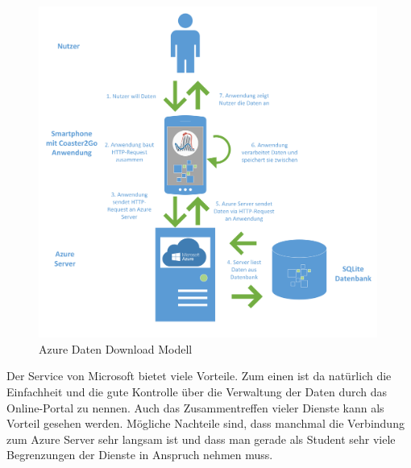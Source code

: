 \begin{figure}[htp]
	\centering
  	\includegraphics[width=0.99\textwidth]{img/modelle/azure_downloadmodell.png}
	\caption{Azure Daten Download Modell}
	\label{figure:besonderheitenAzure}
\end{figure}

Der Service von Microsoft bietet viele Vorteile. Zum einen ist da natürlich die Einfachheit und die gute Kontrolle über die Verwaltung der Daten durch das Online-Portal zu nennen. Auch das Zusammentreffen vieler Dienste kann als Vorteil gesehen werden. Mögliche Nachteile sind, dass manchmal die Verbindung zum Azure Server sehr langsam ist und dass man gerade als Student sehr viele Begrenzungen der Dienste in Anspruch nehmen muss.

